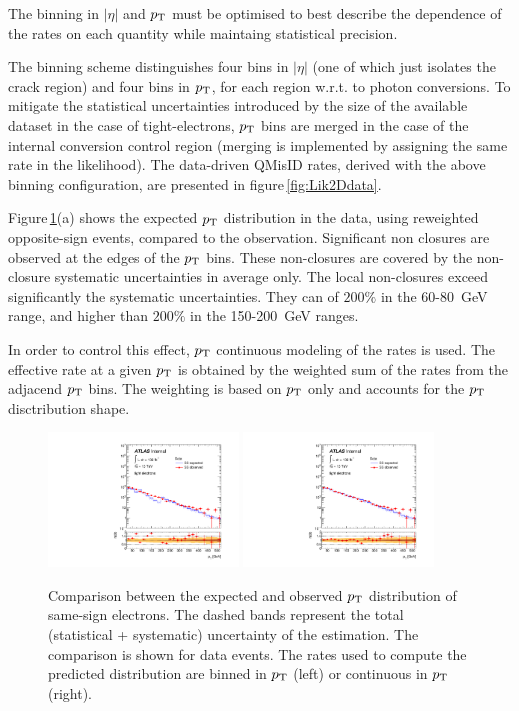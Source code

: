 The binning in $|\eta|$ and $p_{\mathrm{T}}$ must be optimised to best describe the dependence of the rates on each quantity
while maintaing statistical precision.

The binning scheme 
distinguishes four bins in $|\eta|$ 
(one of which just isolates the crack region) and four bins in $p_{\mathrm{T}}$, for each region w.r.t. to photon conversions. 
To mitigate the statistical uncertainties introduced by the size of the available dataset in the case of 
tight-electrons, $p_{\mathrm{T}}$ bins are merged in the case of the internal conversion control region (merging is 
implemented by assigning the same rate in the likelihood).
The data-driven QMisID rates, derived with the above binning configuration, are presented in figure\,\ref{fig:Lik2Ddata}.

Figure\,\ref{fig:DatapTJumps}(a) shows the expected $p_{\mathrm{T}}$ distribution in the
data, using reweighted opposite-sign events, compared to the
observation. Significant non closures are observed at the edges of the $p_{\mathrm{T}}$
bins. These non-closures are covered by the non-closure systematic
uncertainties in average only. The local non-closures exceed significantly the
systematic uncertainties. They can of $200\%$ in the 60-80~GeV range, and higher
than $200\%$ in the 150-200~GeV ranges.
 
In order to control this effect, $p_{\mathrm{T}}$ continuous modeling of the rates is
used. The effective rate at a given $p_{\mathrm{T}}$ is obtained by the weighted
sum of the rates from the adjacend $p_{\mathrm{T}}$ bins. The weighting is based on
$p_{\mathrm{T}}$ only and accounts for the $p_{\mathrm{T}}$ disctribution shape.

\begin{figure}[htb!]
\centering
  \includegraphics[width=0.45\textwidth]{figures/qmisid/valid_PttightData_binned}
  \includegraphics[width=0.45\textwidth]{figures/qmisid/valid_PttightData}\\
  \caption{Comparison between the expected and observed $p_{\mathrm{T}}$ distribution of same-sign electrons.
  The dashed bands represent the total (statistical + systematic) uncertainty of the estimation. The comparison is shown for
  data events. The rates used to compute the predicted distribution are
  binned in $p_{\mathrm{T}}$ (left) or continuous in $p_{\mathrm{T}}$ (right).\label{fig:DatapTJumps}}
\end{figure}


